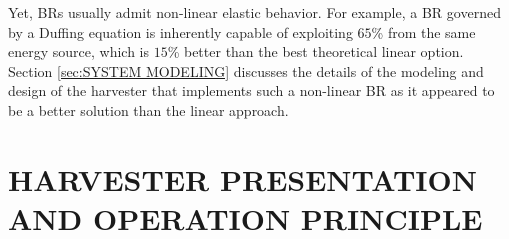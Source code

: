 \documentclass[3p,twocolumn,preprint]{elsarticle}
\begin{document}
Yet, BRs usually admit non-linear elastic behavior. For example, a BR governed by a Duffing equation is inherently capable of exploiting $65$\% from the same energy source, which is $15$\% better than the best theoretical linear option. Section \ref{sec:SYSTEM MODELING} discusses the details of the modeling and design of the harvester that implements such a non-linear BR as it appeared to be a better solution than the linear approach. 




\section{HARVESTER PRESENTATION AND OPERATION \mbox{PRINCIPLE}}
\label{sec:HARVESTER PRESENTATION AND OPERATION PRINCIPLE}
\end{document}
